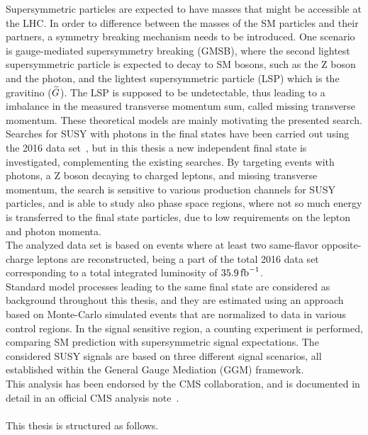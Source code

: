 Supersymmetric particles are expected to have masses that might be accessible at the LHC. In order to difference between the masses of the SM particles and their partners, a symmetry breaking mechanism needs to be introduced. One scenario is gauge-mediated supersymmetry breaking (GMSB), where the second lightest supersymmetric particle is expected to decay to SM bosons, such as the Z boson and the photon, and the lightest supersymmetric particle (LSP) which is the gravitino ($\widetilde{G}$). The LSP is supposed to be undetectable, thus leading to a imbalance in the measured transverse momentum sum, called missing transverse momentum. These theoretical models are mainly motivating the presented search. \\
Searches for SUSY with photons in the final states have been carried out using the 2016 data set~\cite{PhotonHT,PhotonMet,PhotonBJet,PhotonLepton}, but in this thesis a new independent final state is investigated, complementing the existing searches. By targeting events with photons, a Z boson decaying to charged leptons, and missing transverse momentum, the search is sensitive to various production channels for SUSY particles, and is able to study also phase space regions, where not so much energy is transferred to the final state particles, due to low requirements on the lepton and photon momenta.\\
The analyzed data set is based on events where at least two same-flavor opposite-charge leptons are reconstructed, being a part of the total 2016 data set corresponding to a total integrated luminosity of $35.9\mbox{\ensuremath{\,\text{fb}^\text{$-$1}}}$.\\
Standard model processes leading to the same final state are considered as background throughout this thesis, and they are estimated using an approach based on Monte-Carlo simulated events that are normalized to data in various control regions. In the signal sensitive region, a counting experiment is performed, comparing SM prediction with supersymmetric signal expectations. The considered SUSY signals are based on three different signal scenarios, all established within the General Gauge Mediation (GGM) framework.\\
This analysis has been endorsed by the CMS collaboration, and is documented in detail in an official CMS analysis note~\cite{MyAN}.\\\\
This thesis is structured as follows.
